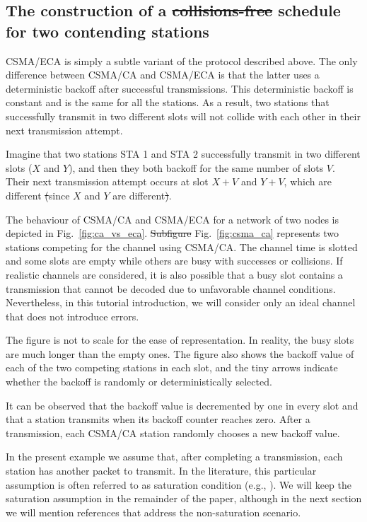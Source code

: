 \documentclass[journal]{IEEEtran}
\providecommand{\DIFadd}[1]{{\protect\color{blue}\uwave{#1}}} %
\providecommand{\DIFdel}[1]{{\protect\color{red}\sout{#1}}}                      %
\providecommand{\DIFaddbegin}{} %
\providecommand{\DIFaddend}{} %
\providecommand{\DIFdelbegin}{} %
\providecommand{\DIFdelend}{} %
\begin{document}
\subsection{The construction of a \DIFdelbegin \DIFdel{collisions-free }\DIFdelend \DIFaddbegin \DIFadd{collision-free }\DIFaddend schedule for two contending stations}
CSMA/ECA is simply a subtle variant of the protocol described above.
The only difference between CSMA/CA and CSMA/ECA is that the latter uses a deterministic backoff after successful transmissions.
This deterministic backoff is constant and is the same for all the stations.
As a result, two stations that successfully transmit in two different slots will not collide with each other in their next transmission attempt.

Imagine that two stations STA 1 and STA 2 successfully transmit in two different slots ($X$ and $Y$),  and then they both backoff for the same number of slots $V$.
Their next transmission attempt occurs at slot $X+V$ and $Y+V$, which are different \DIFdelbegin \DIFdel{(}\DIFdelend since $X$ and $Y$ are different\DIFdelbegin \DIFdel{)}\DIFdelend .

The behaviour of CSMA/CA and CSMA/ECA for a network of two nodes is depicted in Fig.~\ref{fig:ca_vs_eca}.
\DIFdelbegin \DIFdel{Subfigure }\DIFdelend Fig.~\ref{fig:csma_ca} represents two stations competing for the channel using CSMA/CA.
The channel time is slotted and some slots are empty while others are busy with successes or collisions.
If realistic channels are considered, it is also possible that a busy slot contains a transmission that cannot be decoded due to unfavorable channel conditions.
Nevertheless, in this tutorial introduction, we will consider only an ideal channel that does not introduce errors.

The figure is not to scale for the ease of representation.
In reality, the busy slots are much longer than the empty ones. 
The figure also shows the backoff value of each of the two competing stations in each slot, and the tiny arrows indicate whether the backoff is randomly or deterministically selected.

It can be observed that the backoff value is decremented by one in every slot and that a station transmits when its backoff counter reaches zero.
After a transmission, each CSMA/CA station randomly chooses a new backoff value.

In the present example we assume that, after completing a transmission, each station has another packet to transmit.
In the literature, this particular assumption is often referred to as saturation condition (e.g., \cite{he2009srb,barcelo2010fcc,fang2011dlm,barcelo2011tcf}).
We will keep the saturation assumption in the remainder of the paper, although in the next section we will mention references that address the non-saturation scenario.
\end{document}
